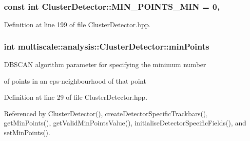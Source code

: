 \hypertarget{classmultiscale_1_1analysis_1_1ClusterDetector_aa0219df3977a845e46be090e6c3f90ad}{
\subsubsection[{M\-I\-N\-\_\-\-P\-O\-I\-N\-T\-S\-\_\-\-M\-I\-N}]{\setlength{\rightskip}{0pt plus 5cm}const int Cluster\-Detector\-::\-M\-I\-N\-\_\-\-P\-O\-I\-N\-T\-S\-\_\-\-M\-I\-N = 0\hspace{0.3cm}{\ttfamily [static]}, {\ttfamily [private]}}}\label{classmultiscale_1_1analysis_1_1ClusterDetector_aa0219df3977a845e46be090e6c3f90ad}


Definition at line 199 of file Cluster\-Detector.\-hpp.

\hypertarget{classmultiscale_1_1analysis_1_1ClusterDetector_aa94df1adc462be5931ec25ba24122fe9}{
\subsubsection[{min\-Points}]{\setlength{\rightskip}{0pt plus 5cm}int multiscale\-::analysis\-::\-Cluster\-Detector\-::min\-Points\hspace{0.3cm}{\ttfamily [protected]}}}\label{classmultiscale_1_1analysis_1_1ClusterDetector_aa94df1adc462be5931ec25ba24122fe9}
\begin{DoxyVerb}                  DBSCAN algorithm parameter for specifying the minimum number
\end{DoxyVerb}
 of points in an eps-\/neighbourhood of that point 

Definition at line 29 of file Cluster\-Detector.\-hpp.



Referenced by Cluster\-Detector(), create\-Detector\-Specific\-Trackbars(), get\-Min\-Points(), get\-Valid\-Min\-Points\-Value(), initialise\-Detector\-Specific\-Fields(), and set\-Min\-Points().

